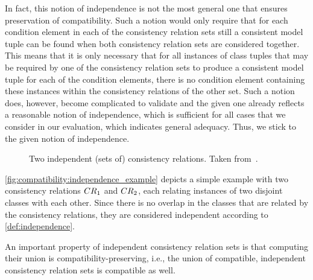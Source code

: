 In fact, this notion of independence is not the most general one that ensures preservation of compatibility.
Such a notion would only require that for each condition element in each of the consistency relation sets still a consistent model tuple can be found when both consistency relation sets are considered together.
This means that it is only necessary that for all instances of class tuples that may be required by one of the consistency relation sets to produce a consistent model tuple for each of the condition elements, there is no condition element containing these instances within the consistency relations of the other set.
Such a notion does, however, become complicated to validate and the given one already reflects a reasonable notion of independence, which is sufficient for all cases that we consider in our evaluation, which indicates general adequacy.
Thus, we stick to the given notion of independence.

\begin{figure}
    \centering
    
    \caption[Two independent sets of consistency relations]{Two independent (sets of) consistency relations. Taken from~.}
    \label{fig:compatibility:independence_example}
\end{figure}

\begin{example}
\autoref{fig:compatibility:independence_example} depicts a simple example with two consistency relations $\consistencyrelation{CR}{1}$ and $\consistencyrelation{CR}{2}$, each relating instances of two disjoint classes with each other.
Since there is no overlap in the classes that are related by the consistency relations, they are considered independent according to \autoref{def:independence}.
\end{example}

An important property of independent consistency relation sets is that computing their union is compatibility-preserving, i.e., the union of compatible, independent consistency relation sets is compatible as well.

